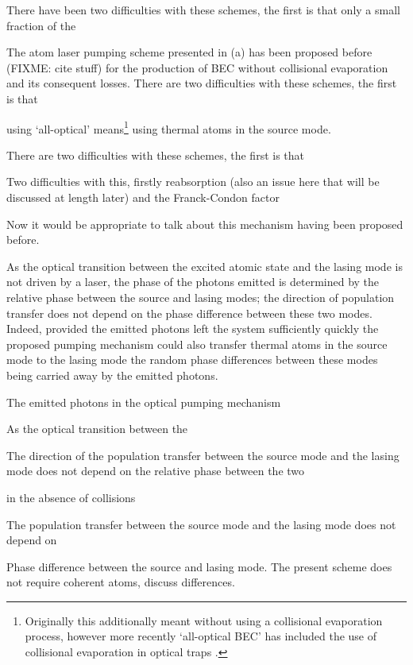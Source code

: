 There have been two difficulties with these schemes, the first is that only a small fraction of the 


The atom laser pumping scheme presented in (a) has been proposed before (FIXME: cite stuff) for the production of BEC without collisional evaporation and its consequent losses.  There are two difficulties with these schemes, the first is that 


using `all-optical' means\footnote{Originally this additionally meant without using a collisional evaporation process, however more recently `all-optical BEC' has included the use of collisional evaporation in optical traps \citep{Barrett:2001}.} using thermal atoms in the source mode.  


There are two difficulties with these schemes, the first is that 


Two difficulties with this, firstly reabsorption (also an issue here that will be discussed at length later) and the Franck-Condon factor




Now it would be appropriate to talk about this mechanism having been proposed before.




As the optical transition between the excited atomic state and the lasing mode is not driven by a laser, the phase of the photons emitted is determined by the relative phase between the source and lasing modes; the direction of population transfer does not depend on the phase difference between these two modes.  Indeed, provided the emitted photons left the system sufficiently quickly the proposed pumping mechanism could also transfer thermal atoms in the source mode to the lasing mode the random phase differences between these modes being carried away by the emitted photons.



The emitted photons in the optical pumping mechanism 




As the optical transition between the 


The direction of the population transfer between the source mode and the lasing mode does not depend on the relative phase between the two 

in the absence of collisions

The population transfer between the source mode and the lasing mode does not depend on 


Phase difference between the source and lasing mode. The present scheme does not require coherent atoms, discuss differences.

